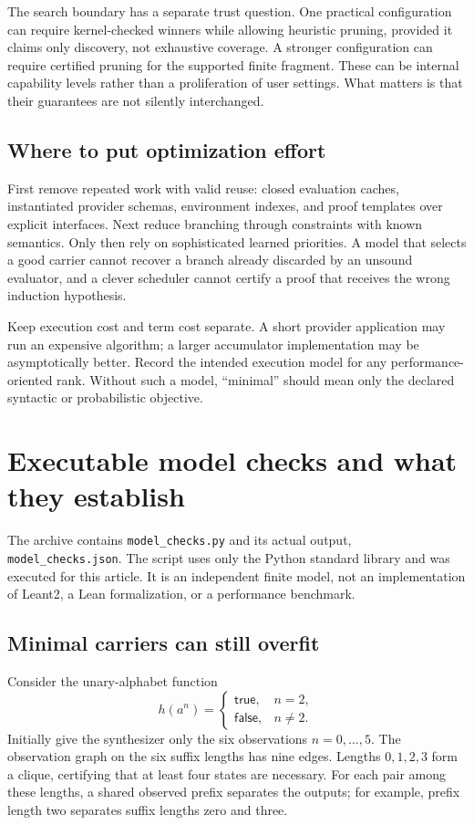 \documentclass[11pt,a4paper]{article}
\newcommand{\code}[1]{\nolinkurl{#1}}
\theoremstyle{remark}
\begin{document}
The search boundary has a separate trust question. One practical configuration can require kernel-checked winners while allowing heuristic pruning, provided it claims only discovery, not exhaustive coverage. A stronger configuration can require certified pruning for the supported finite fragment. These can be internal capability levels rather than a proliferation of user settings. What matters is that their guarantees are not silently interchanged.

\subsection{Where to put optimization effort}

First remove repeated work with valid reuse: closed evaluation caches, instantiated provider schemas, environment indexes, and proof templates over explicit interfaces. Next reduce branching through constraints with known semantics. Only then rely on sophisticated learned priorities. A model that selects a good carrier cannot recover a branch already discarded by an unsound evaluator, and a clever scheduler cannot certify a proof that receives the wrong induction hypothesis.

Keep execution cost and term cost separate. A short provider application may run an expensive algorithm; a larger accumulator implementation may be asymptotically better. Record the intended execution model for any performance-oriented rank. Without such a model, ``minimal'' should mean only the declared syntactic or probabilistic objective.

\section{Executable model checks and what they establish}\label{sec:checks}

The archive contains \code{model_checks.py} and its actual output, \code{model_checks.json}. The script uses only the Python standard library and was executed for this article. It is an independent finite model, not an implementation of Leant2, a Lean formalization, or a performance benchmark.

\subsection{Minimal carriers can still overfit}

Consider the unary-alphabet function
\[
 h(a^n)=\begin{cases}\mathsf{true},&n=2,\\\mathsf{false},&n\ne2.\end{cases}
\]
Initially give the synthesizer only the six observations $n=0,\ldots,5$. The observation graph on the six suffix lengths has nine edges. Lengths $0,1,2,3$ form a clique, certifying that at least four states are necessary. For each pair among these lengths, a shared observed prefix separates the outputs; for example, prefix length two separates suffix lengths zero and three.
\end{document}
